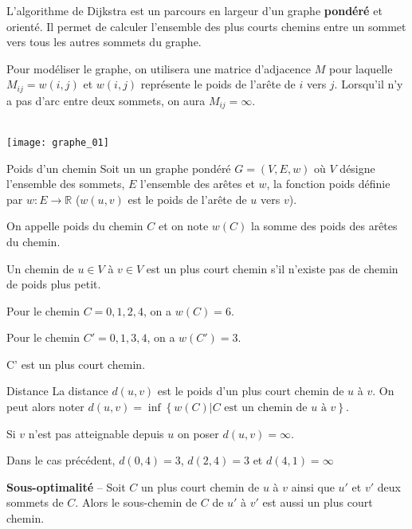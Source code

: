 L'algorithme de Dijkstra est un parcours en largeur d'un graphe \textbf{pondéré} et orienté. Il permet de calculer l'ensemble des plus courts chemins entre un sommet vers tous les autres sommets du graphe.

Pour modéliser le graphe, on utilisera une matrice d'adjacence $M$ pour laquelle $M_{ij}=w(i,j)$ et $w(i,j)$ représente le poids de l'arête de $i$ vers $j$. Lorsqu'il n'y a pas d'arc entre deux sommets, on aura $M_{ij}=\infty$.

\begin{exemple}  ~\\
\texttt{[image: graphe\_01]}
\end{exemple}

\begin{defi}{Poids d'un chemin}
Soit un un graphe pondéré $G=\left(V, E, w\right)$ où $V$ désigne l'ensemble des sommets, $E$ l'ensemble des arêtes et 
$w$, la fonction poids définie par $w : E \rightarrow \mathbb{R}$ ($w(u, v)$ est le poids de l’arête de $u$ vers $v$).

On appelle poids du chemin $C$ et on note $w(C)$ la somme des poids des arêtes du chemin. 

Un chemin de $u\in V$ à $v\in V$ est un plus court chemin s'il n'existe pas de chemin de poids plus petit. 
\end{defi}


\begin{exemple}
Pour le chemin $C = 0, 1,2,4$, on a $w(C)=6$. 

Pour le chemin $C' = 0, 1,3,4$, on a $w(C')=3$. 

C' est un plus court chemin. 
\end{exemple}

\begin{defi} {Distance}
La distance $d\left(u,v\right)$ est le poids d'un plus court chemin de $u$ à $v$. On peut alors noter 
$d(u,v)=\inf\left\{
w(C) | C \text{ est un chemin de } u \text{ à } v
\right\}$.

Si $v$  n'est pas atteignable depuis $u$ on poser $d(u,v)=\infty$.

\end{defi}

\begin{exemple}
Dans le cas précédent, $d(0,4)=3$, 
$d(2,4)=3$ et $d(4,1)=\infty$


\end{exemple}

\begin{prop}
\textbf{Sous-optimalité} -- Soit $C$ un plus court chemin de $u$ à $v$ ainsi que $u'$ et $v'$ deux sommets de $C$. Alors le sous-chemin de $C$ de $u'$ à $v'$ est aussi un plus court chemin.
\end{prop}


